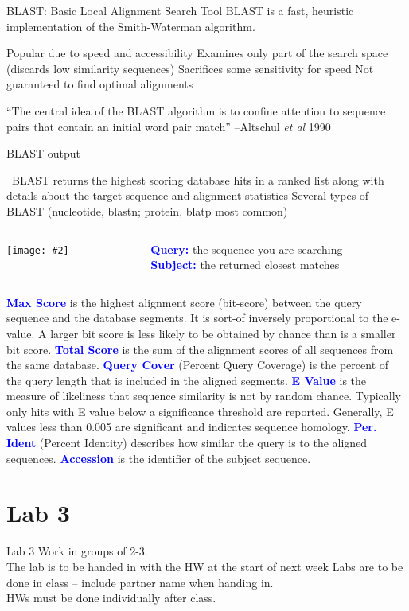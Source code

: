 \documentclass{beamer}
\renewcommand{\c}[1]{\begin{center}#1\end{center}}
\newcommand{\blu}[1]{\textcolor{blue}{\textbf{#1}}}
\newcommand{\gr}[2][.95]{\c{\texttt{[image: \#2]}}}
\begin{document}
\begin{frame}{BLAST: Basic Local Alignment Search Tool}
BLAST is a fast, heuristic implementation of the Smith-Waterman algorithm.
\begin{outline}
\1 Popular due to speed and accessibility
\1 Examines only part of the search space (discards low similarity sequences)
\1 Sacrifices some sensitivity for speed
\1 Not guaranteed to find optimal alignments
\end{outline}
\bigskip
\footnotesize
``The central idea of the BLAST algorithm is to confine attention to sequence pairs that contain an initial word pair match''
--Altschul \textit{et al} 1990
\end{frame}

\begin{frame}{BLAST output}
\tiny
\begin{outline}
\ BLAST returns the highest scoring database hits in a ranked list along with details about the target sequence and alignment statistics
\1 Several types of BLAST (nucleotide, blastn; protein, blatp most common)
\end{outline}

\begin{columns}
\begin{column}{0.8\textwidth}
    \gr{l3_figs/s47_blastout.png}
\end{column}
\begin{column}{0.2\textwidth}
    \blu{Query:} the sequence you are searching\\
    \blu{Subject:} the returned closest matches
\end{column}
\end{columns}

\begin{outline}
\tiny
\1 \blu{Max Score} is the highest alignment score (bit-score) between the query sequence and the database segments. It is sort-of inversely proportional to the e-value. A larger bit score is less likely to be obtained by chance than is a smaller bit score.
\1 \blu{Total Score} is the sum of the alignment scores of all sequences from the same database.
\1 \blu{Query Cover} (Percent Query Coverage) is the percent of the query length that is included in the aligned segments.
\1 \blu{E Value} is the measure of likeliness that sequence similarity is not by random chance.
    \2[] \tiny Typically only hits with E value below a significance threshold are reported.
    \2[] Generally, E values less than 0.005 are significant and indicates sequence homology.
\1 \blu{Per. Ident} (Percent Identity) describes how similar the query is to the aligned sequences.
\1 \blu{Accession} is the identifier of the subject sequence.
\end{outline}
\end{frame}

\section{Lab 3}

\begin{frame}{Lab 3}
Work in groups of 2-3.\\
\bigskip
The lab is to be handed in with the HW at the start of next week
Labs are to be done in class – include partner name when handing in.\\
\bigskip
HWs must be done individually after class.
\end{frame}
\end{document}
